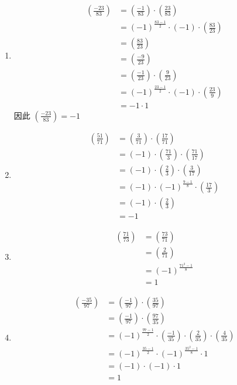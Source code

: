\begin{enumerate}
\begin{solution}
    \begin{enumerate}
        \item 
        \begin{align*}
        \left(\frac{-23}{83}\right) &= \left(\frac{-1}{83}\right) \cdot \left(\frac{23}{83}\right)\\
        &= (-1)^{\frac{83-1}{2}} \cdot (-1) \cdot \left(\frac{83}{23}\right)\\
        &= \left(\frac{83}{23}\right)\\
        &= \left(\frac{-9}{23}\right)\\
        &= \left(\frac{-1}{23}\right) \cdot \left(\frac{9}{23}\right)\\
        &= (-1)^{\frac{23-1}{2}} \cdot (-1) \cdot \left(\frac{23}{9}\right)\\
        &= -1 \cdot 1
        \end{align*}
        因此 $\left(\frac{-23}{83}\right) = -1$

        \item 
        \begin{align*}
        \left(\frac{51}{71}\right) &= \left(\frac{3}{71}\right) \cdot \left(\frac{17}{71}\right)\\
        &= (-1) \cdot \left(\frac{71}{3}\right) \cdot \left(\frac{71}{17}\right)\\
        &= (-1) \cdot \left(\frac{2}{3}\right) \cdot \left(\frac{3}{17}\right)\\
        &= (-1) \cdot (-1)^{\frac{9-1}{8}} \cdot \left(\frac{17}{3}\right)\\
        &= (-1)  \cdot \left(\frac{2}{3}\right)\\
        &= -1
        \end{align*}

        \item 
        \begin{align*}
        \left(\frac{71}{73}\right) &= \left(\frac{73}{71}\right)\\
        &= \left(\frac{2}{71}\right)\\
        &= (-1)^{\frac{71^2-1}{8}}\\
        &= 1
        \end{align*}

        \item 
        \begin{align*}
        \left(\frac{-35}{97}\right) &= \left(\frac{-1}{97}\right) \cdot \left(\frac{35}{97}\right)\\
        &= \left(\frac{-1}{97}\right) \cdot \left(\frac{97}{35}\right)\\
        &= (-1)^{\frac{97-1}{2}} \cdot (\frac{-1}{35}) \cdot (\frac{2}{35}) \cdot (\frac{4}{35})\\
        &= (-1)^{\frac{35-1}{2}} \cdot (-1)^{\frac{35^2-1}{8}} \cdot 1 \\
        &= (-1) \cdot (-1) \cdot 1\\
        &= 1
        \end{align*}
    \end{enumerate}
\end{solution}


\end{enumerate}
